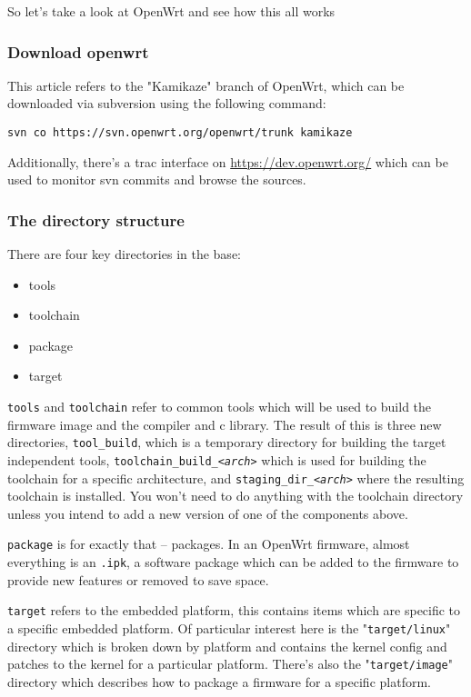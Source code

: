 So let's take a look at OpenWrt and see how this all works


\subsubsection{Download openwrt}

This article refers to the "Kamikaze" branch of OpenWrt, which can be downloaded via
subversion using the following command:

\begin{Verbatim}
svn co https://svn.openwrt.org/openwrt/trunk kamikaze
\end{Verbatim}

Additionally, there's a trac interface on \href{https://dev.openwrt.org/}{https://dev.openwrt.org/}
which can be used to monitor svn commits and browse the sources.


\subsubsection{The directory structure}

There are four key directories in the base:

\begin{itemize}
    \item tools
    \item toolchain
    \item package
    \item target
\end{itemize}

\texttt{tools} and \texttt{toolchain} refer to common tools which will be
used to build the firmware image and the compiler and c library.
The result of this is three new directories, \texttt{tool\_build}, which is a temporary
directory for building the target independent tools, \texttt{toolchain\_build\_\textit{<arch>}}
which is used for building the toolchain for a specific architecture, and
\texttt{staging\_dir\_\textit{<arch>}} where the resulting toolchain is installed.
You won't need to do anything with the toolchain directory unless you intend to
add a new version of one of the components above.

\texttt{package} is for exactly that -- packages. In an OpenWrt firmware, almost everything
is an \texttt{.ipk}, a software package which can be added to the firmware to provide new
features or removed to save space.

\texttt{target} refers to the embedded platform, this contains items which are specific to
a specific embedded platform. Of particular interest here is the "\texttt{target/linux}"
directory which is broken down by platform and contains the kernel config and patches
to the kernel for a particular platform. There's also the "\texttt{target/image}" directory
which describes how to package a firmware for a specific platform.

